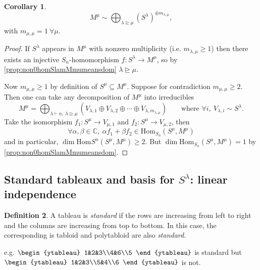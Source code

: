\documentclass{article}
\newcommand{\C}{\mathbb{C}}
\newcommand{\Hom}{\text{Hom}}
\theoremstyle{definition}
\newtheorem{defn}{Definition}[subsection]
\newtheorem{coro}[defn]{Corollary}
\begin{document}
\begin{coro}
\[
M^\mu\sim\bigoplus_{\lambda\unrhd\mu} (S^\lambda)^{\oplus m_{\lambda,\mu}},
\]
with $m_{\mu,\mu}=1 \ \forall \mu$.
\end{coro}
\begin{proof}
If $S^\lambda$ appears in $M^\mu$ with nonzero multiplicity (i.e. $m_{\lambda,\mu}\geq 1$) then there exists an injective $S_n$-homomorphism $f:S^\lambda\rightarrow M^\mu$, so by \ref{prop:non0homSlamMmumeansdom} $\lambda\unrhd\mu$.

Now $m_{\mu,\mu}\geq 1$ by definition of $S^\mu\subseteq M^\mu$. Suppose for contradiction $m_{\mu,\mu}\geq 2$. Then one can take any decomposition of $M^\mu$ into irreducibles
\[
M^\mu=\bigoplus_{\lambda\vdash n,\ \lambda\unrhd\mu} \left(V_{\lambda,1}\oplus V_{\lambda,2}\oplus\cdots\oplus V_{\lambda,m_{\lambda,\mu}}\right) \qquad \text{where } \forall i,\ V_{\lambda,i}\sim S^\lambda.
\]
Take the isomorphism $f_1:S^\mu\rightarrow V_{\mu,1}$ and $f_2:S^\mu\rightarrow V_{\mu,2}$, then
\[
\forall\alpha,\beta\in\C,\ \alpha f_1+\beta f_2\in\Hom_{S_n}(S^\mu,M^\mu)
\]
and in particular, $\dim\Hom{S^n}(S^\mu,M^\mu)\geq 2$. But $\dim\Hom_{S_n}(S^\mu,M^\mu)=1$ by \ref{prop:non0homSlamMmumeansdom}.
\end{proof}

\subsection{Standard tableaux and basis for $S^\lambda$: linear independence}
\begin{defn}
A tableau is \textit{standard} if the rows are increasing from left to right and the columns are increasing from top to bottom. In this case, the corresponding is tabloid and polytabloid are also \textit{standard}.
\end{defn}
e.g. $\begin{ytableau}
1&2&3\\4&6\\5
\end{ytableau}$ is standard but $\begin{ytableau}
1&2&3\\5&4\\6
\end{ytableau}$ is not.
\end{document}
